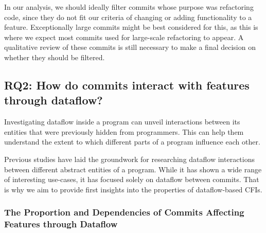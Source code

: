 In our analysis, we should ideally filter commits whose purpose was refactoring code, since they do not fit our criteria of changing or adding functionality to a feature.
Exceptionally large commits might be best considered for this, as this is where we expect most commits used for large-scale refactoring to appear.
A qualitative review of these commits is still necessary to make a final decision on whether they should be filtered.

\subsection[RQ2: How do commits interact with features through dataflow?]{\textbf{RQ2}: How do commits interact with features through dataflow?}\label{sec:meth:RQ2}

Investigating dataflow inside a program can unveil interactions between its entities that were previously hidden from programmers.
This can help them understand the extent to which different parts of a program influence each other.

Previous studies have laid the groundwork for researching dataflow interactions between different abstract entities of a program.
While it has shown a wide range of interesting use-cases, it has focused solely on dataflow between commits.
That is why we aim to provide first insights into the properties of dataflow-based CFIs.

\subsubsection*{The Proportion and Dependencies of Commits Affecting Features through Dataflow}

